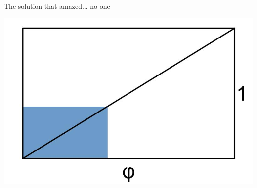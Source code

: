 \documentclass[14pt]{beamer}
\begin{document}

    {
    \begin{frame}[plain]
    \end{frame}
    }


    \begin{frame}{The solution that amazed... no one}
        \begin{center}
            \includegraphics[height=30ex]{pictures/Rectangle.jpg}
        \end{center}
    \end{frame}

\end{document}
